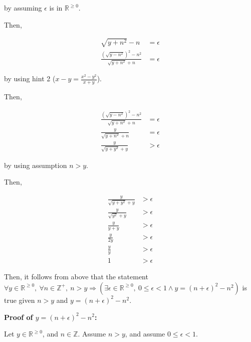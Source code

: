 \documentclass[12pt]{article}
\begin{document}
\begin{enumerate}[a.]
    by assuming $\epsilon$ is in $\mathbb{R}^{\geq 0}$.

    \bigskip

    Then,

    \begin{align}
        \sqrt{y + n^2} - n &= \epsilon\\
        \frac{(\sqrt{y - n^2})^2 - n^2}{\sqrt{y + n^2} + n} &= \epsilon
    \end{align}

    by using hint 2 ($x -y = \frac{x^2 - y^2}{x + y}$).

    \bigskip

    Then,

    \begin{align}
        \frac{(\sqrt{y - n^2})^2 - n^2}{\sqrt{y + n^2} + n} &= \epsilon\\
        \frac{y}{\sqrt{y + n^2} + n} &= \epsilon\\
        \frac{y}{\sqrt{y + y^2} + y} &> \epsilon
    \end{align}

    by using assumption $n > y$.

    \bigskip

    Then,

    \begin{align}
        \frac{y}{\sqrt{y + y^2} + y} &> \epsilon\\
        \frac{y}{\sqrt{y^2} + y} &> \epsilon\\
        \frac{y}{y + y} &> \epsilon\\
        \frac{y}{2y} &> \epsilon\\
        \frac{y}{y} &> \epsilon\\
        1 &> \epsilon
    \end{align}

    Then, it follows from above that the statement $\forall y \in \mathbb{R}^{\geq 0},\:
    \forall n \in \mathbb{Z}^{+},\:n>y \Rightarrow (\exists \epsilon \in \mathbb{R}^{\geq 0},\:
    0 \leq \epsilon < 1 \land y = (n + \epsilon)^2 - n^2)$ is true given $n>y$ and
    $y = (n + \epsilon)^2 - n^2$.

    \bigskip

    \textbf{Proof of $y = (n + \epsilon)^2 - n^2$:}

    \bigskip

    Let $y \in \mathbb{R}^{\geq 0}$, and $n \in \mathbb{Z}$. Assume $n >y$, and
    assume $0 \leq \epsilon < 1$.

    \bigskip


\end{enumerate}
\end{document}
